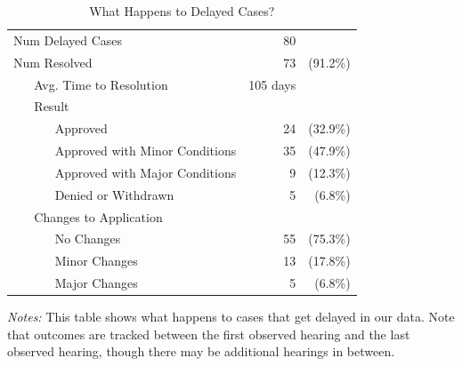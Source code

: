 
\begin{table}[H]
\centering
\caption{What Happens to Delayed Cases?}
\vspace{0.2cm}
\label{tab_delayed_outcomes}
\begin{threeparttable}
\begin{tabular}{lrr} \toprule
 Num Delayed Cases & 80  & \\ [1ex]
Num Resolved      & 73  & (91.2\%) \\ [1ex]
~ ~ Avg. Time to Resolution & 105 days & \\ [1ex]
~ ~ Result & & \\ [1ex]
~ ~ ~ ~ Approved & 24  & (32.9\%) \\ [1ex]
~ ~ ~ ~ Approved with Minor Conditions & 35  & (47.9\%) \\ [1ex]
~ ~ ~ ~ Approved with Major Conditions & 9  & (12.3\%) \\ [1ex]
~ ~ ~ ~ Denied or Withdrawn & 5  & (6.8\%) \\ [1ex]
~ ~ Changes to Application & & \\ [1ex]
~ ~ ~ ~ No Changes & 55  & (75.3\%) \\ [1ex]
~ ~ ~ ~ Minor Changes & 13  & (17.8\%) \\ [1ex]
~ ~ ~ ~ Major Changes & 5  & (6.8\%) \\ [1ex]

\bottomrule
\end{tabular}
\begin{tablenotes}
\item {\textit{Notes: } This table shows what happens to cases that get delayed in our data. Note that outcomes are tracked between the first observed hearing and the last observed hearing, though there may be additional hearings in between.}
\end{tablenotes}
\end{threeparttable}
\end{table}
